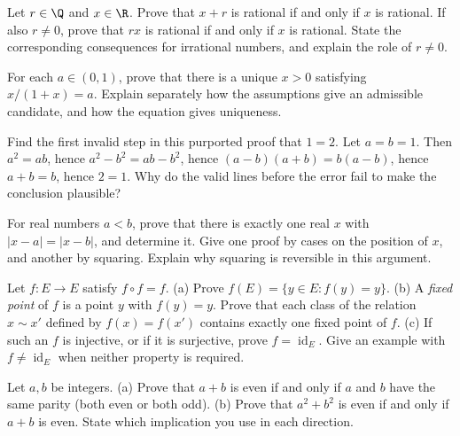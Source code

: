 \begin{exercise}[$\star\star$]\label{ex:lang-rational}
Let $r\in\Q$ and $x\in\R$. Prove that $x+r$ is rational if and only if $x$ is rational. If also $r\ne 0$, prove that $rx$ is rational if and only if $x$ is rational. State the corresponding consequences for irrational numbers, and explain the role of $r\ne 0$.
\end{exercise}

\begin{exercise}[$\star\star$]\label{ex:lang-existence}
For each $a\in(0,1)$, prove that there is a unique $x>0$ satisfying $x/(1+x)=a$. Explain separately how the assumptions give an admissible candidate, and how the equation gives uniqueness.
\end{exercise}

\begin{exercise}[$\star$]\label{ex:lang-falseproof}
Find the first invalid step in this purported proof that $1=2$. Let $a=b=1$. Then $a^2=ab$, hence $a^2-b^2=ab-b^2$, hence $(a-b)(a+b)=b(a-b)$, hence $a+b=b$, hence $2=1$. Why do the valid lines before the error fail to make the conclusion plausible?
\end{exercise}

\begin{exercise}[$\star\star$]\label{ex:lang-midpoint}
For real numbers $a<b$, prove that there is exactly one real $x$ with $|x-a|=|x-b|$, and determine it. Give one proof by cases on the position of $x$, and another by squaring. Explain why squaring is reversible in this argument.
\end{exercise}

\begin{exercise}[$\star\star\star$]\label{ex:lang-retraction}
Let $f:E\to E$ satisfy $f\circ f=f$.
(a) Prove $f(E)=\{y\in E:f(y)=y\}$.
(b) A \emph{fixed point} of $f$ is a point $y$ with $f(y)=y$. Prove that each class of the relation $x\sim x'$ defined by $f(x)=f(x')$ contains exactly one fixed point of $f$.
(c) If such an $f$ is injective, or if it is surjective, prove $f=\operatorname{id}_E$.
Give an example with $f\ne\operatorname{id}_E$ when neither property is required.
\end{exercise}

\begin{exercise}[$\star\star$]\label{ex:lang-parity-sum}
Let $a,b$ be integers.
(a) Prove that $a+b$ is even if and only if $a$ and $b$ have the same
parity (both even or both odd).
(b) Prove that $a^2+b^2$ is even if and only if $a+b$ is even.
State which implication you use in each direction.
\end{exercise}

